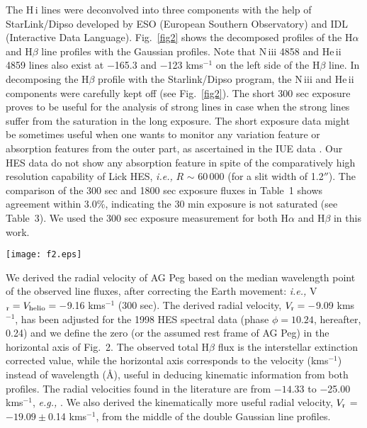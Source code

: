 \documentclass[a4paper,fleqn,usenatbib,useAMS]{mnras}
\def\eg{{\it e.g.,} }
\def\ie{{\it i.e.,} }
\def\ha{H{$\alpha$}}
\def\hb{H{$\beta$}}
\def\hi{H\,{\sc i}}
\def\heii{He\,{\sc ii}}
\def\niii{N\,{\sc iii}}
\def\kms{km\hspace{1pt}s$^{-1}$}
\begin{document}
The {\hi} lines were deconvolved into three components with the help of  StarLink/Dipso developed by ESO (European Southern Observatory) and IDL (Interactive Data Language). Fig.~\ref{fig2} shows the decomposed profiles of the {\ha} and {\hb} line profiles with the Gaussian profiles. Note that {\niii} 4858 and {\heii} 4859 lines also exist at $-$165.3 and $-$123 {\kms} on the left side  of the {\hb} line. In decomposing the {\hb} profile with the Starlink/Dipso program, the {\niii}  and {\heii} components were carefully kept off (see Fig.~\ref{fig2}). The short 300 sec exposure proves to be useful for the analysis of strong lines in case when the strong lines suffer from the saturation in the long exposure. The short exposure data might be sometimes useful when one wants to monitor any variation feature or absorption features from the outer part, as ascertained in the IUE data \citep{eri04}. Our HES data do not show any absorption feature in spite of the comparatively high resolution capability of Lick HES, \ie $R$ $\sim$ 60\,000 (for a slit width of 1.2$''$). The comparison of the 300 sec and 1800 sec exposure fluxes in Table~1  shows agreement within 3.0\%, indicating the 30 min exposure is  not saturated (see Table~3). We used the 300 sec exposure  measurement  for both {\ha} and {\hb} in this work.


\begin{figure*}
\texttt{[image: f2.eps]}
\caption{{\ha} and {\hb} spectral line profiles. Observation year: 1998 ($\phi$ = 0.24). Exposures = 300 sec and 1800 sec. Flux: interstellar extinction corrected. Flux unit: 10$^{-13}$ erg s$^{-1}$ cm$^{-2}$ per radial velocity in {\kms}. The decomposed {\hb} profile also shows the other nearby {\niii} 4858 and
{\heii} 4859 lines.}
\label{fig2}
\end{figure*}

We derived the radial velocity of AG Peg based on the median wavelength point of the observed line fluxes, after correcting the Earth movement: \ie V$_{\rm r} = V_{\rm helio} = -$9.16 {\kms} (300 sec).
The derived radial velocity, $V_{\rm r} = -$9.09 {\kms}, has been
adjusted for the 1998 HES spectral data (phase $\phi = 10.24$, hereafter, 0.24)
and we define the zero (or the  assumed rest frame of AG Peg) in the horizontal axis of Fig.~2. The observed total {\hb} flux is the interstellar extinction corrected value, while the horizontal axis corresponds to the velocity ({\kms}) instead of wavelength (\AA), useful in deducing kinematic information from both profiles. The radial velocities found in the literature are from $-14.33$ to $-$25.00 {\kms}, \eg \citet{ike04}. We also derived the kinematically more useful radial velocity,  $V_{\rm r}$ = $-19.09\pm$0.14  {\kms}, from the middle of the double Gaussian line profiles.
\end{document}
